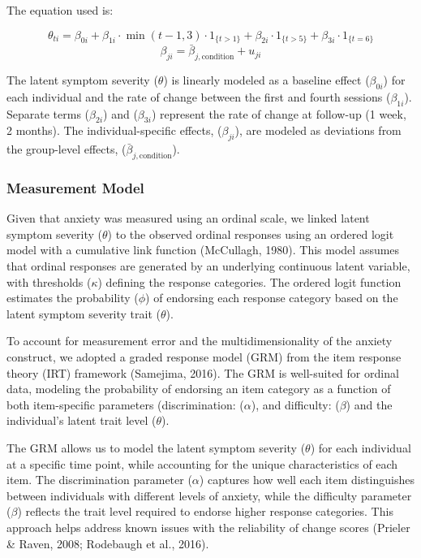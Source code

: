 \documentclass[
  man,floatsintext]{apa7}
\begin{document}
The equation used is:

\[\theta_{ti} = \beta_{0i} + \beta_{1i} \cdot \min(t-1, 3) \cdot 1_{\{t > 1\}} + \beta_{2i} \cdot 1_{\{t > 5\}} + \beta_{3i} \cdot 1_{\{t=6\}}\]
\[\beta_{ji} = \bar{\beta}_{j,\text{condition}} + u_{ji}\]

The latent symptom severity (\(\theta\)) is linearly modeled as a baseline effect (\(\beta_{0i}\)) for each individual and the rate of change between the first and fourth sessions (\(\beta_{1i}\)).
Separate terms (\(\beta_{2i}\)) and (\(\beta_{3i}\)) represent the rate of change at follow-up (1 week, 2 months).
The individual-specific effects, (\(\beta_{ji}\)), are modeled as deviations from the group-level effects, (\(\bar{\beta}_{j,\text{condition}}\)).

\subsubsection{Measurement Model}\label{measurement-model}

Given that anxiety was measured using an ordinal scale, we linked latent symptom severity (\(\theta\)) to the observed ordinal responses using an ordered logit model with a cumulative link function (McCullagh, 1980).
This model assumes that ordinal responses are generated by an underlying continuous latent variable, with thresholds (\(\kappa\)) defining the response categories.
The ordered logit function estimates the probability (\(\phi\)) of endorsing each response category based on the latent symptom severity trait (\(\theta\)).

To account for measurement error and the multidimensionality of the anxiety construct, we adopted a graded response model (GRM) from the item response theory (IRT) framework (Samejima, 2016).
The GRM is well-suited for ordinal data, modeling the probability of endorsing an item category as a function of both item-specific parameters (discrimination: (\(\alpha\)), and difficulty: (\(\beta\)) and the individual's latent trait level (\(\theta\)).

The GRM allows us to model the latent symptom severity (\(\theta\)) for each individual at a specific time point, while accounting for the unique characteristics of each item.
The discrimination parameter (\(\alpha\)) captures how well each item distinguishes between individuals with different levels of anxiety, while the difficulty parameter (\(\beta\)) reflects the trait level required to endorse higher response categories.
This approach helps address known issues with the reliability of change scores (Prieler \& Raven, 2008; Rodebaugh et al., 2016).
\end{document}
